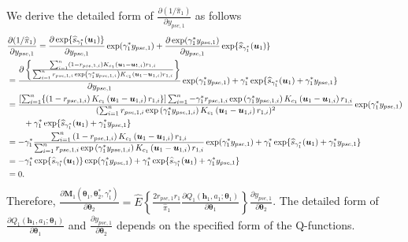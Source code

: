 \documentclass[12pt]{article}
\begin{document}
\iffalse
We derive the detailed form of $\frac{\partial ( 1/\widehat{\pi}_1)}{\partial y_{pse,1}}$ as follows
\begin{align}
    &\frac{\partial  ( 1/\widehat{\pi}_1)}{\partial y_{pse,1}} =
    \frac{\partial \exp\{\widehat{s}_{\gamma_1^*}(\bm{u}_1) \}}{\partial y_{pse,1}} \exp(\gamma_1^*y_{pse,1}) +  \frac{\partial \exp(\gamma_1^*y_{pse,1})}{\partial y_{pse,1}}\exp\{\widehat{s}_{\gamma_1^*}(\bm{u}_1) \} \notag \\
    &= \frac{\partial \left\{\frac{\sum_{i=1}^{n} \left(1-r_{pse,1,i}\right)  K_{c_1}\left(\bm{u}_1-\bm{u}_{1,i}\right) r_{1,i} }{\sum_{i=1}^{n}  r_{pse,1,i}   \exp \left(\gamma_1^*y_{pse,1,i}\right) K_{c_1}\left(\bm{u}_1-\bm{u}_{1,i}\right) r_{1,i}} \right\}}{\partial y_{pse,1}} \exp(\gamma_1^*y_{pse,1}) +   \gamma_1^* \exp\{\widehat{s}_{\gamma_1^*}(\bm{u}_1) + \gamma_1^*y_{pse,1}\}  \notag \\
    &= \frac{ [\sum_{i=1}^{n} \{\left(1-r_{pse,1,i}\right)  K_{c_1}\left(\bm{u}_1-\bm{u}_{1,i}\right) r_{1,i}\} ] \sum_{i=1}^{n} -\gamma_1^* r_{pse,1,i}   \exp \left(\gamma_1^*y_{pse,1,i}\right) K_{c_1}\left(\bm{u}_1-\bm{u}_{1,i}\right) r_{1,i}}{(\sum_{i=1}^{n}  r_{pse,1,i}   \exp \left(\gamma_1^*y_{pse,1,i}\right) K_{c_1}\left(\bm{u}_1-\bm{u}_{1,i}\right) r_{1,i})^2}  \exp(\gamma_1^*y_{pse,1})  \notag  \\
    &\qquad  +   \gamma_1^* \exp\{\widehat{s}_{\gamma_1^*}(\bm{u}_1) + \gamma_1^*y_{pse,1}\}  \notag \\
    & = -\gamma_1^* \frac{\sum_{i=1}^{n} \left(1-r_{pse,1,i}\right)  K_{c_1}\left(\bm{u}_1-\bm{u}_{1,i}\right) r_{1,i} }{\sum_{i=1}^{n}  r_{pse,1,i}   \exp \left(\gamma_1^*y_{pse,1,i}\right) K_{c_1}\left(\bm{u}_1-\bm{u}_{1,i}\right) r_{1,i}} \exp(\gamma_1^*y_{pse,1}) +   \gamma_1^* \exp\{\widehat{s}_{\gamma_1^*}(\bm{u}_1) + \gamma_1^*y_{pse,1}\}  \notag \\
    &= -\gamma_1^* \exp\{\widehat{s}_{\gamma_1^*}(\bm{u}_1)\} \exp(\gamma_1^*y_{pse,1}) +   \gamma_1^* \exp\{\widehat{s}_{\gamma_1^*}(\bm{u}_1) + \gamma_1^*y_{pse,1}\}  \notag  \\
    &=0.
\end{align}
Therefore, $\frac{\partial \bm{M}_1(\bm{\theta}_1, \bm{\theta}_2^*,\gamma_1^*)}{\partial \bm{\theta}_2} = \widehat{E} \left\{ \frac{2 r_{pse,1} r_1}{\widehat{\pi}_1} \frac{\partial Q_1(\bm{h}_1,a_1;\bm{\theta}_1)}{\partial \bm{\theta}_1}   \right\} \frac{\partial y_{pse,1}}{\partial \bm{\theta}_2}$. The detailed form of $\frac{\partial Q_1(\bm{h}_1,a_1;\bm{\theta}_1)}{\partial \bm{\theta}_1}$ and $\frac{\partial y_{pse,1}}{\partial \bm{\theta}_2}$ depends on the specified form of the Q-functions.
\end{document}
